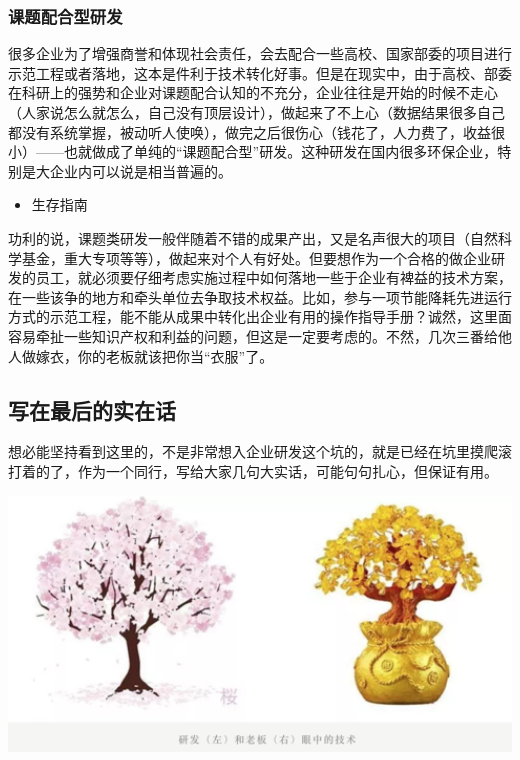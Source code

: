 \documentclass[
]{book}
\providecommand{\tightlist}{%
  \setlength{\itemsep}{0pt}\setlength{\parskip}{0pt}}
\begin{document}
\hypertarget{ux8bfeux9898ux914dux5408ux578bux7814ux53d1}{%
\subsubsection{课题配合型研发}\label{ux8bfeux9898ux914dux5408ux578bux7814ux53d1}}

很多企业为了增强商誉和体现社会责任，会去配合一些高校、国家部委的项目进行示范工程或者落地，这本是件利于技术转化好事。但是在现实中，由于高校、部委在科研上的强势和企业对课题配合认知的不充分，企业往往是开始的时候不走心（人家说怎么就怎么，自己没有顶层设计），做起来了不上心（数据结果很多自己都没有系统掌握，被动听人使唤），做完之后很伤心（钱花了，人力费了，收益很小）------也就做成了单纯的``课题配合型''研发。这种研发在国内很多环保企业，特别是大企业内可以说是相当普遍的。

\begin{itemize}
\tightlist
\item
  生存指南
\end{itemize}

功利的说，课题类研发一般伴随着不错的成果产出，又是名声很大的项目（自然科学基金，重大专项等等），做起来对个人有好处。但要想作为一个合格的做企业研发的员工，就必须要仔细考虑实施过程中如何落地一些于企业有裨益的技术方案，在一些该争的地方和牵头单位去争取技术权益。比如，参与一项节能降耗先进运行方式的示范工程，能不能从成果中转化出企业有用的操作指导手册？诚然，这里面容易牵扯一些知识产权和利益的问题，但这是一定要考虑的。不然，几次三番给他人做嫁衣，你的老板就该把你当``衣服''了。

\hypertarget{ux5199ux5728ux6700ux540eux7684ux5b9eux5728ux8bdd}{%
\subsection{写在最后的实在话}\label{ux5199ux5728ux6700ux540eux7684ux5b9eux5728ux8bdd}}

想必能坚持看到这里的，不是非常想入企业研发这个坑的，就是已经在坑里摸爬滚打着的了，作为一个同行，写给大家几句大实话，可能句句扎心，但保证有用。

\includegraphics[width=6.67in]{images/qiye6}
\end{document}
